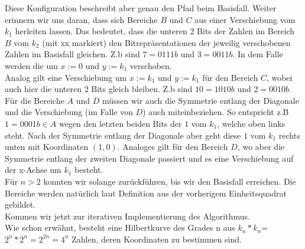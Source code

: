 \documentclass[course=erap]{aspdoc}
\begin{document}
Diese Konfiguration beschreibt aber genau den Pfad beim Basisfall. Weiter
erinnern wir uns daran, dass sich Bereiche $B$ und $C$ aus einer Verschiebung
vom $k_{1}$ herleiten lassen. Das bedeutet, dass die unteren 2 Bits der Zahlen
im Bereich $B$ vom $k_{2}$ (mit xx markiert) den Bitrepräsentationen der
jeweilig verschobenen Zahlen im Basisfall gleichen. Z.b sind $7=0111b$ und
$3=0011b$. In dem Falle werden die um $x:=0$ und $y:={k_{1}}$ verschoben.\\
Analog gilt eine Verschiebung um $x:={k_{1}}$ und $y:={k_{1}}$ für den Bereich
$C$, wobei auch hier die unteren 2 Bits gleich bleiben. Z.b sind $10=1010b$ und
$2=0010b$.\\ Für die Bereiche $A$ und $D$ müssen wir auch die Symmetrie entlang
der Diagonale und die Verschiebung (im Falle von $D$) auch miteinbeziehen. So
entspricht z.B $1=0001b\in A$ wegen den letzten beiden Bits der $1$ vom
$k_{1}$, welche oben links steht. Nach der Symmetrie entlang der Diagonale aber
geht diese $1$  vom $k_{1}$ rechts unten mit Koordinaten $(1,0)$. Analoges gilt
für den Bereich $D$, wo aber die Symmetrie entlang der zweiten Diagonale
passiert und es eine Verschiebung auf der x-Achse um $k_{1}$ besteht.\\ Für
$n>2$ konnten wir solange zurückführen, bis wir den Basisfall erreichen. Die
Bereiche werden natürlich laut Definition aus der vorherigem Einheitsquadrat
gebildet.\\ Kommen wir jetzt zur iterativen Implementierung des Algorithmus.\\
Wie schon erwähnt, besteht eine Hilbertkurve des Grades n aus
$k_{n}*k_{n}$=$2^n*2^n=2^{2n}=4^n$ Zahlen, deren Koordinaten zu bestimmen sind.
\end{document}
